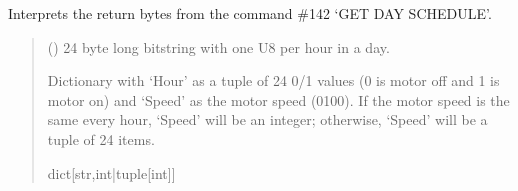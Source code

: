 \documentclass[letterpaper,10pt,english]{sphinxmanual}
\begin{document}
\begin{fulllineitems}
\begin{fulllineitems}
\begin{quote}
\begin{description}
\end{description}\end{quote}

\end{fulllineitems}


\begin{fulllineitems}
\label{\detokenize{PodDevice_8229:PodDevice_8229.POD_8229.DecodeDaySchedule}}
\pysigstartsignatures
{}
\pysigstopsignatures
\sphinxAtStartPar
Interprets the return bytes from the command \#142 ‘GET DAY SCHEDULE’.
\begin{quote}\begin{description}
\sphinxAtStartPar
{} () \textendash{} 24 byte long bitstring with one U8 per hour in a day.

\sphinxAtStartPar
Dictionary with ‘Hour’ as a tuple of 24 0/1 values (0 is motor off and                 1 is motor on) and ‘Speed’ as the motor speed (0\sphinxhyphen{}100). If the motor speed is the same                 every hour, ‘Speed’ will be an integer; otherwise, ‘Speed’ will be a tuple of 24 items.

\sphinxAtStartPar
dict{[}str,int|tuple{[}int{]}{]}

\end{description}\end{quote}

\end{fulllineitems}



\end{fulllineitems}
\end{document}

